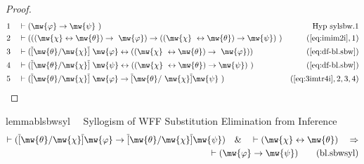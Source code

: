\begin{proof}
\begin{align}
  1 &&  & \vdash ( \mw{\varphi} \rightarrow \mw{\psi}
     ~)&\text{Hyp~sylsbw.1}\notag%
  \\ 2 &&  & \vdash ( ( ( \mw{\chi} \leftrightarrow \mw{\theta} ) \rightarrow
     ~\mw{\varphi} ) \rightarrow ( ( \mw{\chi}
     ~\leftrightarrow \mw{\theta} ) \rightarrow \mw{\psi} )
     ~)&(\mbox{\ref{eq:imim2i}},1)\notag
  \\ 3 &&  & \vdash ( \overline{[} \mw{\theta} / \mw{\chi} \overline{]}
     ~\mw{\varphi} \leftrightarrow ( ( \mw{\chi}
     ~\leftrightarrow \mw{\theta} ) \rightarrow
     ~\mw{\varphi} ) )&(\mbox{\ref{eq:df-bl.sbw}})\notag
  \\ 4 &&  & \vdash ( \overline{[} \mw{\theta} / \mw{\chi} \overline{]}
     ~\mw{\psi} \leftrightarrow ( ( \mw{\chi}
     ~\leftrightarrow \mw{\theta} ) \rightarrow \mw{\psi} )
     ~)&(\mbox{\ref{eq:df-bl.sbw}})\notag
  \\ 5 &&  & \vdash ( \overline{[} \mw{\theta} / \mw{\chi} \overline{]}
     ~\mw{\varphi} \rightarrow \overline{[} \mw{\theta} /
     ~\mw{\chi} \overline{]} \mw{\psi}
     ~)&(\mbox{\ref{eq:3imtr4i}},2,3,4)\notag
\end{align}
\end{proof}

\begin{restatable}{lemma}{blsbwsyl}~~ Syllogism of WFF Substitution Elimination
from Inference
\begin{align}
\vdash ( \overline{[} \mw{\theta} / \mw{\chi} \overline{]} \mw{\varphi}
    \rightarrow \overline{[} \mw{\theta} / \mw{\chi} \overline{]} \mw{\psi}
    )\quad\&\quad \vdash ( \mw{\chi} \leftrightarrow \mw{\theta}
    )\quad\Rightarrow \notag \\ 
	\quad \vdash ( \mw{\varphi} \rightarrow \mw{\psi}
    )\label{eq:bl.sbwsyl}\tag{bl.sbwsyl}
\end{align}
\end{restatable}

